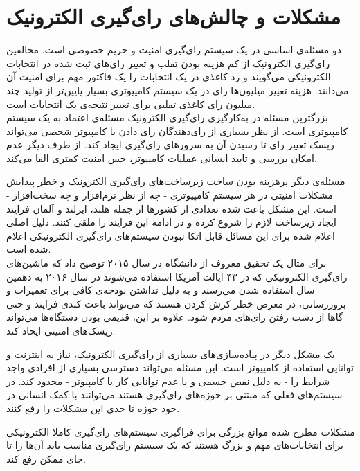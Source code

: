 \section{مشکلات و چالش‌های رای‌گیری الکترونیک}
\par
دو مسئله‌ی اساسی در یک سیستم رای‌گیری امنیت و حریم خصوصی است. مخالفین رای‌گیری الکترونیک از کم هزینه بودن تقلب و تغییر رای‌های ثبت شده در انتخابات الکترونیکی می‌گویند و رد کاغذی در یک انتخابات را یک فاکتور مهم برای امنیت آن می‌دانند. هزینه تغییر میلیون‌ها رای در یک سیستم کامپیوتری بسیار پایین‌تر از تولید چند میلیون رای کاغذی تقلبی برای تغییر نتیجه‌ی یک انتخابات است.
\\
بزرگترین مسئله در به‌کارگیری رای‌گیری الکترونیک مسئله‌ی اعتماد به یک سیستم‌ کامپیوتری است. از نظر بسیاری از رای‌دهندگان رای دادن با کامپیوتر شخصی می‌تواند ریسک تغییر رای تا رسیدن آن به سرور‌های رای‌گیری ایجاد کند. از طرف دیگر عدم امکان بررسی و تایید انسانی عملیات کامپیوتر، حس امنیت کمتری القا می‌کند.
\par
مسئله‌ی دیگر پرهزینه بودن ساخت زیرساخت‌های رای‌گیری الکترونیک و خطر پیدایش مشکلات امنیتی در هر سیستم کامپیوتری - چه از نظر نرم‌افزار و چه سخت‌افزار - است. این مشکل باعث شده تعدادی از کشور‌ها از جمله هلند، ایرلند و آلمان فرایند ایجاد زیرساخت لازم را شروع کرده و در ادامه این فرایند را ملقی کنند. دلیل اصلی اعلام شده برای این مسائل‌ قابل اتکا نبودن سیستم‌های رای‌گیری الکترونیکی اعلام شده است. 
\\
برای مثال یک تحقیق معروف از دانشگاه‌  در سال ۲۰۱۵ 
توضیح داد که ماشین‌های رای‌گیری الکترونیکی که در ۴۳ ایالت آمریکا استفاده می‌شوند در سال ۲۰۱۶ به دهمین سال استفاده شدن می‌رسند و به دلیل نداشتن بودجه‌ی کافی برای تعمیرات و بروزرسانی، در معرض خطر کرش
 کردن هستند که می‌تواند باعث کندی فرایند و حتی گاها از دست رفتن را‌ی‌های مردم شود. علاوه بر این، قدیمی بودن دستگاه‌ها می‌تواند ریسک‌های امنیتی ایحاد کند. 

\par
یک مشکل دیگر در پیاده‌سازی‌های بسیاری از رای‌گیری الکترونیک، نیاز به اینترنت و توانایی استفاده از کامپیوتر است. این مسئله می‌تواند دسترسی بسیاری از افرادی واجد شرایط را - به دلیل نقص جسمی و یا عدم توانایی کار با کامپیوتر - محدود کند. در سیستم‌های فعلی که مبتنی بر حوزه‌های رای‌گیری هستند می‌توانند با کمک انسانی در خود حوزه تا حدی این مشکلات را رفع کنند. 
\par
مشکلات مطرح‌ شده موانع بزرگی برای فراگیری سیستم‌های رای‌گیری کاملا الکترونیکی برای انتخابات‌های مهم و بزرگ هستند که یک سیستم رای‌گیری مناسب باید آن‌ها را تا جای ممکن رفع کند. 

